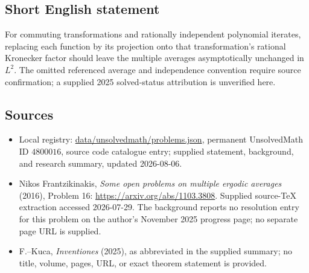 \documentclass[11pt]{article}
\begin{document}
\subsection{Short English statement}
For commuting transformations and rationally independent polynomial iterates, replacing each function by its projection onto that transformation's rational Kronecker factor should leave the multiple averages asymptotically unchanged in \(L^2\). The omitted referenced average and independence convention require source confirmation; a supplied 2025 solved-status attribution is unverified here.
\subsection{Sources}
\begin{itemize}
\item Local registry: \url{data/unsolvedmath/problems.json}, permanent UnsolvedMath ID \(4800016\), source code catalogue entry; supplied statement, background, and research summary, updated 2026-08-06.
\item Nikos Frantzikinakis, \emph{Some open problems on multiple ergodic averages} (2016), Problem 16: \url{https://arxiv.org/abs/1103.3808}. Supplied source-TeX extraction accessed 2026-07-29. The background reports no resolution entry for this problem on the author's November 2025 progress page; no separate page URL is supplied.
\item F.--Kuca, \emph{Inventiones} (2025), as abbreviated in the supplied summary; no title, volume, pages, URL, or exact theorem statement is provided.
\end{itemize}
\end{document}
